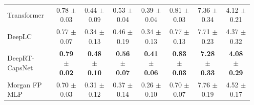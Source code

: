 \begin{table}[htbp]
\begin{tabular}{lccccccc}
    Transformer & 0.78 $\pm$ 0.03 & 0.44 $\pm$ 0.09 & 0.53 $\pm$ 0.04 & 0.39 $\pm$ 0.04 & 0.81 $\pm$ 0.03 & 7.36 $\pm$ 0.34 & 4.12 $\pm$ 0.21 \\
    DeepLC & 0.77 $\pm$ 0.07 & 0.34 $\pm$ 0.13 & 0.46 $\pm$ 0.19 & 0.34 $\pm$ 0.13 & 0.77 $\pm$ 0.13 & 7.71 $\pm$ 0.23 & 4.37 $\pm$ 0.32 \\
    DeepRT-CapsNet & \textbf{0.79 $\pm$ 0.02} & \textbf{0.48 $\pm$ 0.10} & \textbf{0.56 $\pm$ 0.07} & \textbf{0.41 $\pm$ 0.06} & \textbf{0.83 $\pm$ 0.03} & \textbf{7.28 $\pm$ 0.33} & \textbf{4.08 $\pm$ 0.29} \\
    Morgan FP MLP & 0.70 $\pm$ 0.03 & 0.31 $\pm$ 0.12 & 0.37 $\pm$ 0.14 & 0.26 $\pm$ 0.10 & 0.70 $\pm$ 0.07 & 7.76 $\pm$ 0.19 & 4.52 $\pm$ 0.17 \\
    \bottomrule
  \end{tabular}
\end{table}
